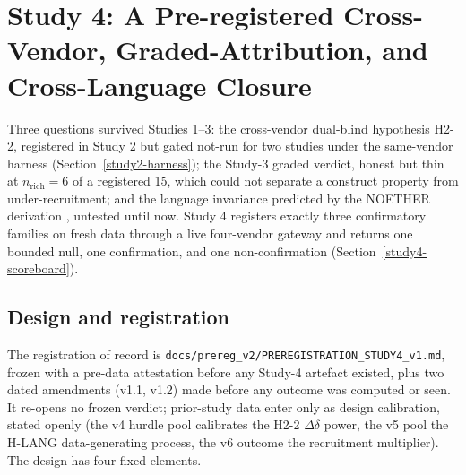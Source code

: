 \documentclass[manuscript,screen,review]{acmart}
\begin{document}
\section{Study 4: A Pre-registered Cross-Vendor, Graded-Attribution, and Cross-Language Closure}\label{study4-closure}

Three questions survived Studies 1--3: the cross-vendor dual-blind hypothesis
H2-2, registered in Study 2 but gated not-run for two studies under the
same-vendor harness (Section~\ref{study2-harness}); the Study-3 graded verdict,
honest but thin at \(n_{\mathrm{rich}} = 6\) of a registered 15, which could
not separate a construct property from under-recruitment; and the language
invariance predicted by the NOETHER derivation \citep{noether2026}, untested
until now. Study 4 registers exactly three confirmatory families on fresh
data through a live four-vendor gateway and returns one bounded null, one
confirmation, and one non-confirmation (Section~\ref{study4-scoreboard}).

\subsection{Design and registration}\label{study4-design}

The registration of record is
\texttt{docs/prereg\_v2/PREREGISTRATION\_STUDY4\_v1.md}, frozen with a
pre-data attestation before any Study-4 artefact existed, plus two dated
amendments (v1.1, v1.2) made before any outcome was computed or seen. It
re-opens no frozen verdict; prior-study data enter only as design
calibration, stated openly (the v4 hurdle pool calibrates the H2-2
\(\Delta\delta\) power, the v5 pool the H-LANG data-generating process, the
v6 outcome the recruitment multiplier). The design has four fixed elements.
\end{document}
